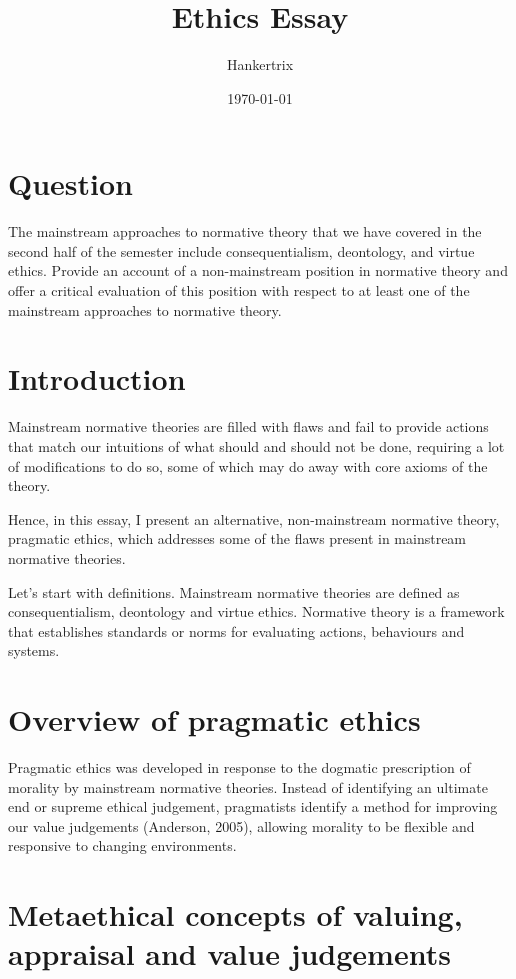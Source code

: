 \documentclass[11pt]{article}
\author{Hankertrix}
\date{\today}
\title{Ethics Essay}
\makeatletter
\newcommand{\cslcitation}[2]
 {\protect\hyper@linkstart{cite}{citeproc_bib_item_#1}#2\hyper@linkend}
\makeatother
\begin{document}
\maketitle
\setcounter{tocdepth}{2}
\tableofcontents \clearpage\section{Question}
\label{sec:org4335d30}
The mainstream approaches to normative theory that we have covered in the
second half of the semester include consequentialism, deontology,
and virtue ethics.
Provide an account of a non-mainstream position in normative theory
and offer a critical evaluation of this position with respect to
at least one of the mainstream approaches to normative theory.
\section{Introduction}
\label{sec:org31d9a01}
Mainstream normative theories are filled with flaws
and fail to provide actions that match our intuitions of what should
and should not be done, requiring a lot of modifications to do so,
some of which may do away with core axioms of the theory.

Hence, in this essay, I present an alternative, non-mainstream
normative theory, pragmatic ethics,
which addresses some of the flaws present in
mainstream normative theories.

Let's start with definitions.
Mainstream normative theories are defined as
consequentialism, deontology and virtue ethics.
Normative theory is a framework that establishes standards
or norms for evaluating actions, behaviours and systems.
\section{Overview of pragmatic ethics}
\label{sec:orge75b225}
Pragmatic ethics was developed in response to the dogmatic prescription
of morality by mainstream normative theories.
Instead of identifying an ultimate end or supreme ethical judgement,
pragmatists identify a method for improving our value judgements
(\cslcitation{1}{Anderson, 2005}),
allowing morality to be flexible and responsive to changing environments.
\section{Metaethical concepts of valuing, appraisal and value judgements}
\label{sec:org84f628f}
\end{document}

